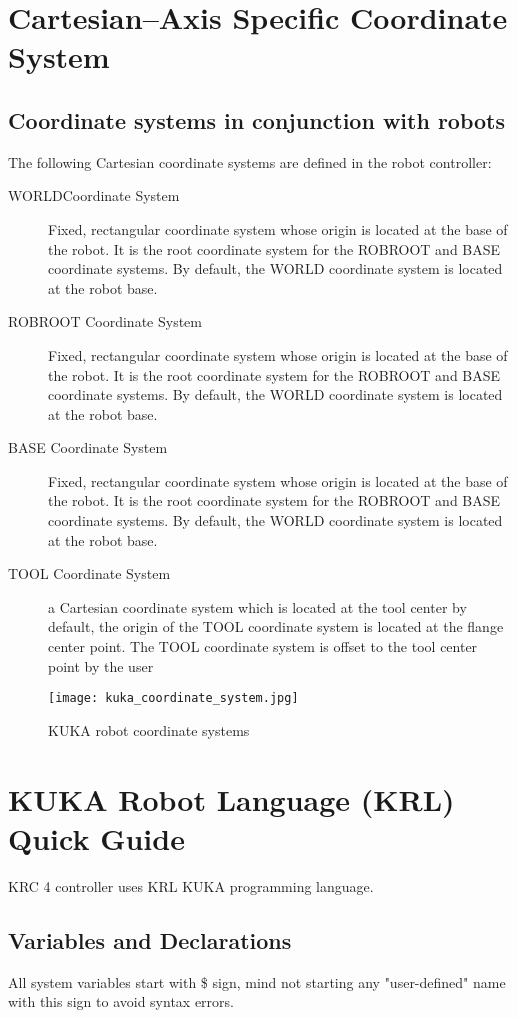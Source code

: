 \section{Cartesian--Axis Specific Coordinate System}

\subsection{Coordinate systems in conjunction with robots}
The following Cartesian coordinate systems are defined in the robot controller:
\begin{description}
	\item [WORLDCoordinate System] 
	Fixed, rectangular coordinate system whose origin is located at the base of the robot. It is the root coordinate system for the ROBROOT and BASE coordinate systems.
	By default, the WORLD coordinate system is located at the robot base.
	\item [ROBROOT Coordinate System]
	Fixed, rectangular coordinate system whose origin is located at the base of the robot. It is the root coordinate system for the ROBROOT and BASE coordinate systems.
	By default, the WORLD coordinate system is located at the robot base.
	\item [BASE Coordinate System]
	Fixed, rectangular coordinate system whose origin is located at the base of the robot. It is the root coordinate system for the ROBROOT and BASE coordinate systems.
	By default, the WORLD coordinate system is located at the robot base.
	\item [TOOL Coordinate System]
	a Cartesian coordinate system which is located at the tool center by default, the origin of the TOOL coordinate system is located at the flange center point. The TOOL coordinate system is offset to the tool center point by the user
\end{description}
\begin{figure}[h]
	\centering
\texttt{[image: kuka\_coordinate\_system.jpg]}
	\caption{KUKA robot coordinate systems}
\end{figure} 

\section{KUKA Robot Language (KRL) Quick Guide}
KRC 4 controller uses KRL KUKA programming language.
\subsection{Variables and Declarations}
All system variables start with \$ sign, mind not starting any "user-defined" name with this sign to avoid syntax errors.

